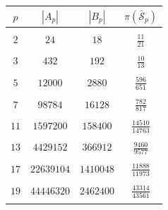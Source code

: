 \documentclass[12pt]{amsart}
\numberwithin{equation}{section}
\begin{document}
\begin{center}
\begin{tabular}{|c|c|c|c|}
\hline
$p$ & $|A_p|$ & $|B_p|$ & $\pi(\bar{\mathcal{S}}_p)$\\  \hline
& & & \\
$2$ & $24$& $18$ & $\displaystyle\frac{11}{21}$ \\ 
& & & \\
$3$ & $432$ & $192$ & $\displaystyle\frac{10}{13}$\\ 
& & & \\
$5$ & $12000$ & $2880$ & $\displaystyle\frac{596}{651}$\\ 
& & & \\
$7$ & $98784$ & $16128$ & $\displaystyle\frac{782}{817}$\\ 
& & & \\
$11$ & $1597200$ & $158400$ & $\displaystyle\frac{14510}{14763}$\\ 
& & & \\
$13$ & $4429152$ & $366912$ & $\displaystyle\frac{9460}{9577}$\\ 
& & & \\
$17$ & $22639104$ & $1410048$ & $\displaystyle\frac{11888}{11973}$\\ 
& & & \\
$19$ & $44446320$ & $2462400$ & $\displaystyle\frac{43314}{43561}$\\  
& & & \\ \hline
\end{tabular}
\end{center}
\end{document}
